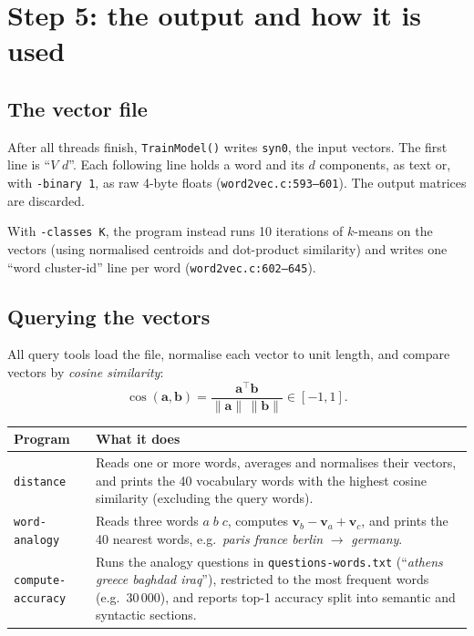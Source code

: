 \documentclass[11pt,a4paper]{article}
\newcommand{\code}[1]{\texttt{#1}}
\newcommand{\src}[1]{\texttt{word2vec.c:#1}}
\newcommand{\vin}{\mathbf{v}}
\begin{document}
\section{Step 5: the output and how it is used}

\subsection{The vector file}

After all threads finish, \code{TrainModel()} writes \code{syn0}, the input
vectors. The first line is ``$V$ $d$''. Each following line holds a word and its $d$
components, as text or, with \code{-binary 1}, as raw 4-byte floats
(\src{593--601}). The output matrices are discarded.

With \code{-classes K}, the program instead runs 10 iterations of $k$-means on the
vectors (using normalised centroids and dot-product similarity) and writes one
``word cluster-id'' line per word (\src{602--645}).

\subsection{Querying the vectors}

All query tools load the file, normalise each vector to unit length, and compare
vectors by \emph{cosine similarity}:
\[
  \cos(\mathbf{a},\mathbf{b}) = \frac{\mathbf{a}^{\top}\mathbf{b}}{\lVert\mathbf{a}\rVert\,\lVert\mathbf{b}\rVert}
  \in[-1,1].
\]

\begin{center}
\begin{tabularx}{\linewidth}{@{}lX@{}}
\toprule
Program & What it does \\
\midrule
\code{distance} & Reads one or more words, averages and normalises their vectors, and
prints the 40 vocabulary words with the highest cosine similarity (excluding the
query words). \\
\code{word-analogy} & Reads three words $a\;b\;c$, computes $\vin_b-\vin_a+\vin_c$, and
prints the 40 nearest words, e.g.\ \emph{paris france berlin} $\to$ \emph{germany}. \\
\code{compute-accuracy} & Runs the analogy questions in \code{questions-words.txt}
(``\emph{athens greece baghdad iraq}''), restricted to the most frequent words
(e.g.\ 30\,000), and reports top-1 accuracy split into semantic and syntactic sections. \\
\bottomrule
\end{tabularx}
\end{center}
\end{document}
